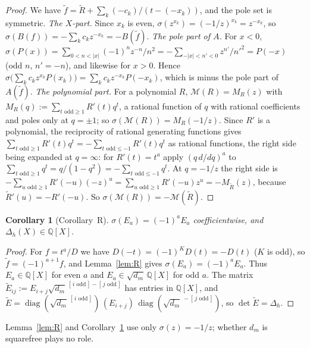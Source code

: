 \documentclass[11pt]{amsart}
\newtheorem{corollary}[theorem]{Corollary}
\theoremstyle{definition}
\theoremstyle{remark}
\numberwithin{equation}{section}
\newcommand{\QQ}{\mathbb{Q}}
\newcommand{\cM}{\mathcal{M}}
\newcommand{\ind}[1]{[\,#1\,]}
\begin{document}
\begin{proof}
We have $\tilde f=\tilde R+\sum_k(-c_k)/(t-(-x_k))$, and the pole set is symmetric. \emph{The $X$-part.} Since $x_k$ is
even, $\sigma(z^{x_k})=(-1/z)^{x_k}=z^{-x_k}$, so $\sigma(B(f))=-\sum_kc_kz^{-x_k}=-B(\tilde f)$. \emph{The pole part
of $A$.} For $x<0$, $\sigma(P(x))=\sum_{0<n<|x|}(-1)^nz^{-n}/n^2=-\sum_{-|x|<n'<0}z^{n'}/n'^2=P(-x)$ (odd $n$, $n'=-n$),
and likewise for $x>0$. Hence $\sigma\bigl(\sum_kc_kz^{x_k}P(x_k)\bigr)=\sum_kc_kz^{-x_k}P(-x_k)$, which is minus the pole
part of $A(\tilde f)$. \emph{The polynomial part.} For a polynomial $R$, $\cM(R)=M_R(z)$ with
$M_R(q):=\sum_{t\text{ odd}\ge1}R'(t)q^t$, a rational function of $q$ with rational coefficients and poles only at
$q=\pm1$; so $\sigma(\cM(R))=M_R(-1/z)$. Since $R'$ is a polynomial, the reciprocity of rational generating functions
gives $\sum_{t\text{ odd}\ge1}R'(t)q^t=-\sum_{t\text{ odd}\le-1}R'(t)q^t$ as rational functions, the right side being
expanded at $q=\infty$: for $R'(t)=t^a$ apply $(q\,d/dq)^a$ to $\sum_{t\text{ odd}\ge1}q^t=q/(1-q^2)=-\sum_{t\text{ odd}\le-1}q^t$. At $q=-1/z$ the
right side is $-\sum_{u\text{ odd}\ge1}R'(-u)(-z)^{u}=\sum_{u\text{ odd}\ge1}R'(-u)z^u=-M_{\tilde R}(z)$, because
$\tilde R'(u)=-R'(-u)$. So $\sigma(\cM(R))=-\cM(\tilde R)$.
\end{proof}

\begin{corollary}[Corollary~R]\label{cor:R}
$\sigma(E_a)=(-1)^aE_a$ coefficientwise, and $\Delta_h(X)\in\QQ[X]$.
\end{corollary}

\begin{proof}
For $f=t^a/D$ we have $D(-t)=(-1)^KD(t)=-D(t)$ ($K$ is odd), so $\tilde f=(-1)^{a+1}f$, and Lemma~\ref{lem:R} gives
$\sigma(E_a)=(-1)^aE_a$. Thus $E_a\in\QQ[X]$ for even $a$ and $E_a\in\sqrt{d_m}\,\QQ[X]$ for odd $a$. The matrix
$\tilde E_{ij}:=E_{i+j}\sqrt{d_m}^{\,\ind{i\text{ odd}}-\ind{j\text{ odd}}}$ has entries in $\QQ[X]$, and
$\tilde E=\operatorname{diag}(\sqrt{d_m}^{\,\ind{i\text{ odd}}})\,(E_{i+j})\,\operatorname{diag}(\sqrt{d_m}^{\,-\ind{j\text{ odd}}})$,
so $\det\tilde E=\Delta_h$.
\end{proof}

Lemma~\ref{lem:R} and Corollary~\ref{cor:R} use only $\sigma(z)=-1/z$; whether $d_m$ is squarefree plays no role.
\end{document}
